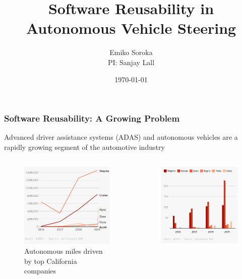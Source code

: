 \documentclass{beamer}
\title{Software Reusability in Autonomous Vehicle Steering}
\author{Emiko Soroka\\PI: Sanjay Lall}
\institute{Stanford University}
\date{\today}
\begin{document}
	
	\frame{\titlepage}
	
\begin{frame}
\frametitle{Software Reusability: A Growing Problem}
Advanced driver assistance systems (ADAS) and autonomous vehicles are a rapidly growing segment of the automotive industry
\begin{columns}
	\begin{column}{0.5\linewidth}
\begin{figure}
	\includegraphics[width=1.0\linewidth]{figures/miles_driven_waymo.png}
	\caption{Autonomous miles driven by top California companies}
\end{figure}
	\end{column}
	\begin{column}{0.45\linewidth}
\begin{figure}
	\includegraphics[width=1.0\linewidth]{figures/miles_by_autonomous_cars.png}

\end{figure}
\end{column}
\end{columns}
\end{frame}
\end{document}
